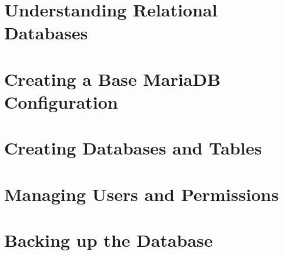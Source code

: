 
\usepackage{minted}
\usepackage{booktabs}


	
	
	\section{Understanding Relational Databases}
	\section{Creating a Base MariaDB Configuration}
	\section{Creating Databases and Tables}
	\section{Managing Users and Permissions}
	\section{Backing up the Database}


